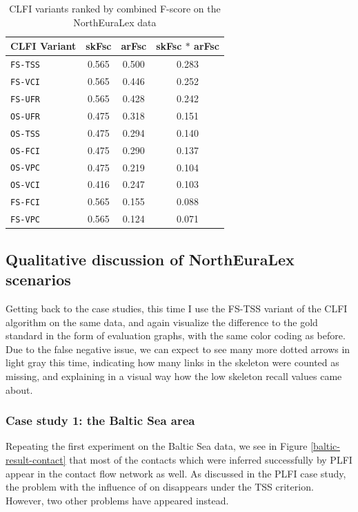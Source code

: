 \begin{table}
 \centering
 \begin{tabular}{lccc}
 \hline \hline
  CLFI Variant & skFsc & arFsc & skFsc $\ast$ arFsc\\ 
 \hline
\texttt{FS-TSS} & 0.565 & 0.500 & 0.283\\
\texttt{FS-VCI} & 0.565 & 0.446 & 0.252\\
\texttt{FS-UFR} & 0.565 & 0.428 & 0.242\\
\texttt{OS-UFR} & 0.475 & 0.318 & 0.151\\
\texttt{OS-TSS} & 0.475 & 0.294 & 0.140\\
\texttt{OS-FCI} & 0.475 & 0.290 & 0.137\\
\texttt{OS-VPC} & 0.475 & 0.219 & 0.104\\
\texttt{OS-VCI} & 0.416 & 0.247 & 0.103\\
\texttt{FS-FCI} & 0.565 & 0.155 & 0.088\\
\texttt{FS-VPC} & 0.565 & 0.124 & 0.071\\
  \hline
 \end{tabular}
 \caption{CLFI variants ranked by combined F-score on the NorthEuraLex data}
 \label{contact-variant-comparison-nelex}
\end{table}

\subsection{Qualitative discussion of NorthEuraLex scenarios}
Getting back to the case studies, this time I use the FS-TSS variant of the CLFI algorithm on the same data, and again visualize the difference to the gold standard in the form of evaluation graphs, with the same color coding as before. Due to the false negative issue, we can expect to see many more dotted arrows in light gray this time, indicating how many links in the skeleton were counted as missing, and explaining in a visual way how the low skeleton recall values came about.

 \subsubsection{Case study 1: the Baltic Sea area}
Repeating the first experiment on the Baltic Sea data, we see in Figure \ref{baltic-result-contact} that most of the contacts which were inferred successfully by PLFI appear in the contact flow network as well. As discussed in the PLFI case study, the problem with the influence of  on  disappears under the TSS criterion. However, two other problems have appeared instead.

